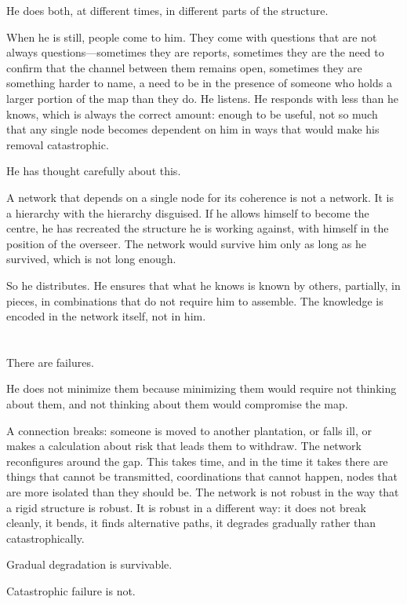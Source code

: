 He does both, at different times, in different parts of the
structure.

When he is still, people come to him. They come with questions
that are not always questions---sometimes they are reports,
sometimes they are the need to confirm that the channel
between them remains open, sometimes they are something
harder to name, a need to be in the presence of someone who
holds a larger portion of the map than they do. He listens.
He responds with less than he knows, which is always the
correct amount: enough to be useful, not so much that any
single node becomes dependent on him in ways that would
make his removal catastrophic.

He has thought carefully about this.

A network that depends on a single node for its coherence
is not a network. It is a hierarchy with the hierarchy
disguised. If he allows himself to become the centre, he
has recreated the structure he is working against, with
himself in the position of the overseer. The network would
survive him only as long as he survived, which is not long
enough.

So he distributes. He ensures that what he knows is known
by others, partially, in pieces, in combinations that do
not require him to assemble. The knowledge is encoded in
the network itself, not in him.

\section{}

There are failures.

He does not minimize them because minimizing them would
require not thinking about them, and not thinking about
them would compromise the map.

A connection breaks: someone is moved to another plantation,
or falls ill, or makes a calculation about risk that leads
them to withdraw. The network reconfigures around the gap.
This takes time, and in the time it takes there are things
that cannot be transmitted, coordinations that cannot
happen, nodes that are more isolated than they should be.
The network is not robust in the way that a rigid structure
is robust. It is robust in a different way: it does not
break cleanly, it bends, it finds alternative paths, it
degrades gradually rather than catastrophically.

Gradual degradation is survivable.

Catastrophic failure is not.

